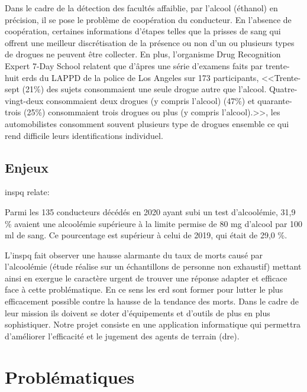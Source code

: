 \documentclass[12pt]{report}
\begin{document}
Dans le cadre de la détection des facultés affaiblie, par l'alcool (éthanol) en précision, il se pose le problème de coopération du conducteur\cite{drugModeling}. En l'absence de coopération, certaines informations d’étapes telles que la prisses de sang qui offrent une meilleur discrétisation de la présence ou non d'un ou plusieurs types de drogues ne peuvent être collecter. En plus,
l'organisme Drug Recognition Expert 7-Day School relatent que d’âpres une série d'examens faits par trente-huit \acrshort{erd}s du LAPPD de la police de Los Angeles sur 173 participants\cite{dre:participant}, <<Trente-sept (21\%) des sujets consommaient une seule drogue autre que l’alcool. Quatre-vingt-deux
consommaient deux drogues (y compris l'alcool) (47\%) et quarante-trois (25\%) consommaient trois drogues ou plus (y compris l'alcool).>>\cite{dre:participant}, les automobilistes consomment souvent plusieurs type de drogues ensemble ce qui rend difficile leurs identifications individuel. 
\subsection{Enjeux}
\acrfull{inspq} relate: \begin{ex}Parmi les 135 conducteurs décédés en 2020 ayant subi un test d’alcoolémie, 31,9 \% avaient une alcoolémie supérieure à la limite permise de 80 mg d’alcool par 100 ml de sang. Ce pourcentage est supérieur à celui de 2019, qui était de 29,0 \%.\cite{INSPQ}
\end{ex}
 L'\acrshort{inspq} fait observer une hausse alarmante du taux de morts causé par l’alcoolémie (étude réalise sur un échantillons de personne non exhaustif) mettant ainsi en exergue le caractère urgent de trouver une réponse adapter et efficace face à cette problématique. En ce sens les \acrshort{erd} sont former pour lutter le plus efficacement possible contre la hausse de la tendance des morts. Dans le cadre de leur mission ils doivent se doter d’équipements et d'outils de plus en plus sophistiquer. Notre projet consiste en une application informatique qui permettra d’améliorer l’efficacité et le jugement des agents de terrain (\gls{dre}).
\section{Problématiques}
\end{document}
